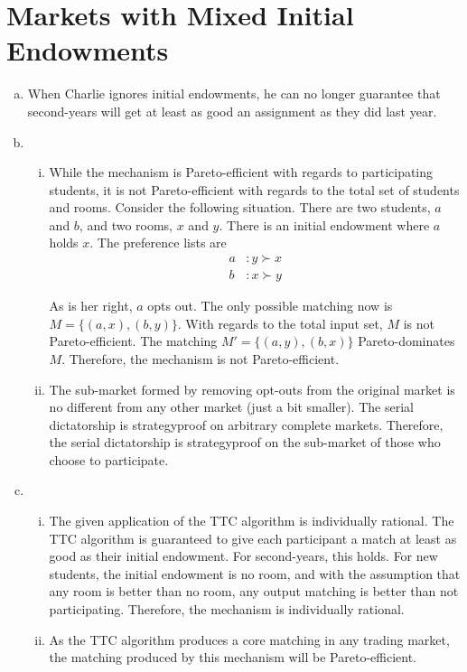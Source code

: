\documentclass[12pt]{article}
\begin{document}
\section{Markets with Mixed Initial Endowments}
\begin{enumerate}[(a)]
\item When Charlie ignores initial endowments, he can no longer guarantee that second-years will get at least as good an assignment as they did last year.

\item 

\begin{enumerate}[i.]
\item While the mechanism is Pareto-efficient with regards to participating students, it is not Pareto-efficient with regards to the total set of students and rooms. Consider the following situation. There are two students, $a$ and $b$, and two rooms, $x$ and $y$. There is an initial endowment where $a$ holds $x$. The preference lists are
\begin{align*}
a &: y \succ x\\
b &: x \succ y
\end{align*}

As is her right, $a$ opts out. The only possible matching now is $M = \{(a, x),  (b, y)\}$. With regards to the total input set, $M$ is not Pareto-efficient. The matching $M' = \{(a, y),  (b, x)\}$ Pareto-dominates $M$. Therefore, the mechanism is not Pareto-efficient.

\item The sub-market formed by removing opt-outs from the original market is no different from any other market (just a bit smaller). The serial dictatorship is strategyproof on arbitrary complete markets. Therefore, the serial dictatorship is strategyproof on the sub-market of those who choose to participate.
\end{enumerate}

\item 
\begin{enumerate}[i.]
\item The given application of the TTC algorithm is individually rational. The TTC algorithm is guaranteed to give each participant a match at least as good as their initial endowment. For second-years, this holds. For new students, the initial endowment is no room, and with the assumption that any room is better than no room, any output matching is better than not participating. Therefore, the mechanism is individually rational.

\item As the TTC algorithm produces a core matching in any trading market, the matching produced by this mechanism will be Pareto-efficient.
\end{enumerate}
\end{enumerate}
\end{document}
